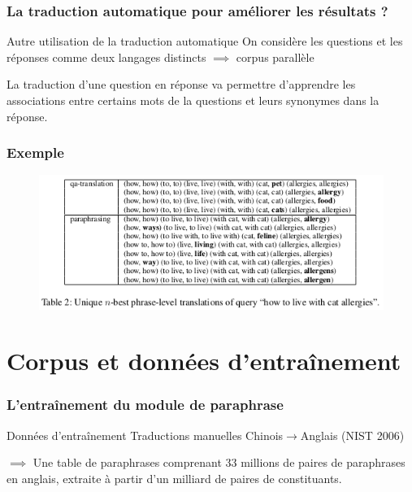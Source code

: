 \documentclass[10pt]{beamer}
\begin{document}
\begin{frame}
  \frametitle{La traduction automatique pour améliorer les résultats
    ?}
  \begin{block}{Autre utilisation de la traduction automatique}
  On considère les questions et les réponses comme deux langages distincts $\implies$ corpus parallèle
  
  La traduction d'une question en réponse va permettre d'apprendre les associations entre certains mots de la questions et leurs synonymes dans la réponse.
  \end{block}
\end{frame}

\begin{frame}
  \frametitle{Exemple}
  \begin{figure}[h]
    \centering
    \includegraphics[width=\textwidth]{table2}
    \label{fig:res}
  \end{figure}
\end{frame}

\section{Corpus et données d'entraînement}
\label{sec:corpus}

\begin{frame}
  \frametitle{L'entraînement du module de paraphrase}
  \begin{block}{Données d'entra\^inement}
    Traductions manuelles Chinois$\rightarrow$Anglais (NIST 2006)
    
    $\implies$ Une table de paraphrases comprenant 33 millions de paires de paraphrases en anglais, extraite à partir d'un milliard de paires de constituants.
  \end{block}
\end{frame}
\end{document}
